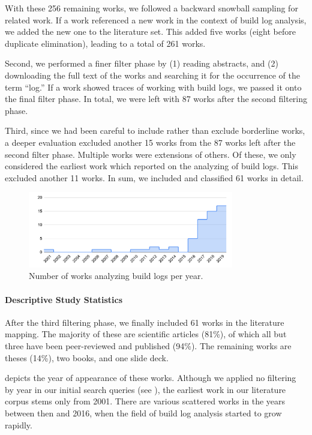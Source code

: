 With these 256 remaining works, we followed a backward snowball
sampling for related work.
If a work referenced a new work in the context
of build log analysis, we added the new one to the literature set.
This added five works (eight before
duplicate elimination), leading to a total of 261
works.

Second, we performed a finer filter phase by (1) reading abstracts,
and (2) downloading the
full text of the works and searching it
for the occurrence of the term ``log.''
If a work showed traces of
working with build logs, we passed it onto the final filter phase.
In total, we
were left with 87 works after the second filtering phase.

Third, since we had been careful to include rather than exclude borderline
works, a deeper evaluation excluded another 15 works from the 87
works left after the second filter phase.
Multiple works were extensions of others.
Of these, we only considered the earliest work which reported on
the analyzing of build logs.
This excluded another 11 works.
In sum, we included and classified 61 works in detail.

\begin{figure}[tbp]
		\centering
		\includegraphics[width=0.8\textwidth,
		clip]{img/lit-sur/years.pdf}
		\caption{Number of works analyzing build logs per year.}
		\label{fig:lit-years}
\end{figure}

\paragraph{Descriptive Study Statistics}
After the third filtering phase, we finally included 61 works in the
literature mapping.
The majority of these are scientific articles (81\%), of which all but
three have been peer-reviewed and published (94\%).
The remaining works are theses (14\%), two books, and one slide deck.

 depicts the year of appearance of these
works.
Although we applied no filtering by year in our initial search queries
(see ), the earliest work in our literature corpus
stems only from 2001.
There are various scattered works in the years between then and 2016,
when the field of build log analysis started to grow rapidly.

